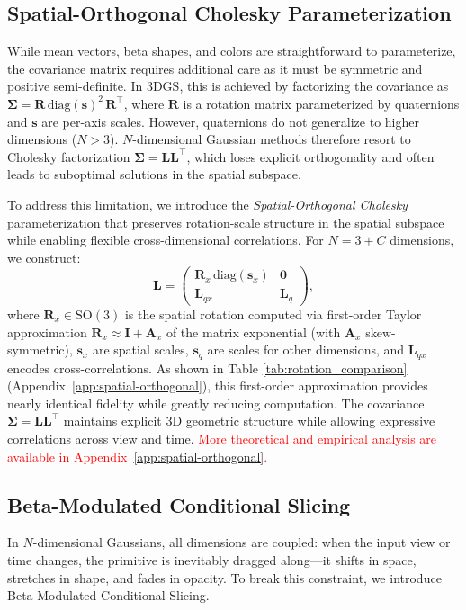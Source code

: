 \documentclass{article} %
\begin{document}
\subsection{Spatial-Orthogonal Cholesky Parameterization}
\label{sec:method_spatial_ortho_chlesky}

While mean vectors, beta shapes, and colors are straightforward to parameterize, the covariance matrix requires additional care as it must be symmetric and positive semi-definite. In 3DGS, this is achieved by factorizing the covariance as $\bm{\Sigma} = \bm{R}\,\text{diag}(\bm{s})^2\,\bm{R}^\top$, where $\bm{R}$ is a rotation matrix parameterized by quaternions and $\bm{s}$ are per-axis scales. However, quaternions do not generalize to higher dimensions ($N>3$). $N$-dimensional Gaussian methods therefore resort to Cholesky factorization $\bm{\Sigma} = \bm{L}\bm{L}^\top$, which loses explicit orthogonality and often leads to suboptimal solutions in the spatial subspace.

To address this limitation, we introduce the \textit{Spatial-Orthogonal Cholesky} parameterization that preserves rotation-scale structure in the spatial subspace while enabling flexible cross-dimensional correlations. For $N = 3 + C$ dimensions, we construct:
\begin{equation}
\bm{L} = \begin{pmatrix}
\bm{R}_x\,\text{diag}(\bm{s}_x) & \bm{0} \\
\bm{L}_{qx} & \bm{L}_{q}
\end{pmatrix},
\end{equation}
where $\bm{R}_x \in \text{SO}(3)$ is the spatial rotation computed via first-order Taylor approximation $\bm{R}_x \approx \bm{I} + \bm{A}_x$ of the matrix exponential (with $\bm{A}_x$ skew-symmetric), $\bm{s}_x$ are spatial scales, $\bm{s}_q$ are scales for other dimensions, and $\bm{L}_{qx}$ encodes cross-correlations. As shown in Table \ref{tab:rotation_comparison} (Appendix~\ref{app:spatial-orthogonal}), this first-order approximation provides nearly identical fidelity while greatly reducing computation. The covariance $\bm{\Sigma} = \bm{L}\bm{L}^\top$ maintains explicit 3D geometric structure while allowing expressive correlations across view and time. \textcolor{red}{More theoretical and empirical analysis are available in Appendix~\ref{app:spatial-orthogonal}.}

\subsection{Beta-Modulated Conditional Slicing}
\label{sec:method_beta_modulated}
In $N$-dimensional Gaussians, all dimensions are coupled: when the input view or time changes, the primitive is inevitably dragged along—it shifts in space, stretches in shape, and fades in opacity. To break this constraint, we introduce Beta-Modulated Conditional Slicing.
\end{document}
